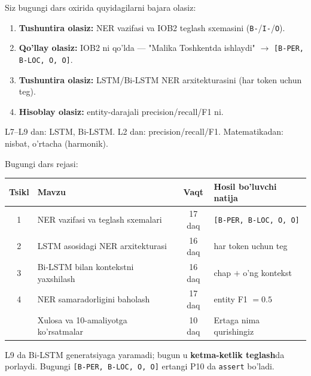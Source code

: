 \documentclass[aspectratio=169,11pt]{beamer}
\begin{document}
\begin{frame}{Siz bugungi dars oxirida quyidagilarni bajara olasiz:}
  \begin{enumerate}\setlength\itemsep{6pt}
    \item \textbf{Tushuntira olasiz:} NER vazifasi va IOB2 teglash sxemasini
          (\texttt{B-}/\texttt{I-}/\texttt{O}).
    \item \textbf{Qo'llay olasiz:} IOB2 ni qo'lda --- "Malika Toshkentda ishlaydi"
          $\to$ \texttt{[B-PER, B-LOC, O, O]}.
    \item \textbf{Tushuntira olasiz:} LSTM/Bi-LSTM NER arxitekturasini (har token
          uchun teg).
    \item \textbf{Hisoblay olasiz:} entity-darajali precision/recall/F1 ni.
  \end{enumerate}
  \vspace{4pt}
  \begin{tcolorbox}[defbox,title=Oldindan talab]
    \footnotesize
    L7--L9 dan: LSTM, Bi-LSTM. L2 dan: precision/recall/F1. Matematikadan: nisbat,
    o'rtacha (harmonik).
  \end{tcolorbox}
\end{frame}

\begin{frame}{Bugungi dars rejasi:}
  \begin{center}
  \small
  \begin{tabular}{c p{5.0cm} c p{3.0cm}}
    \toprule
    \textbf{Tsikl}& \textbf{Mavzu} & \textbf{Vaqt} & \textbf{Hosil bo'luvchi natija}\\
    \midrule
    1 & NER vazifasi va teglash sxemalari & 17 daq & \texttt{[B-PER, B-LOC, O, O]} \\
    2 & LSTM asosidagi NER arxitekturasi & 16 daq & har token uchun teg \\
    3 & Bi-LSTM bilan kontekstni yaxshilash & 16 daq & chap $+$ o'ng kontekst \\
    4 & NER samaradorligini baholash & 17 daq & entity F1 $=0.5$ \\
    \midrule
      & Xulosa va 10-amaliyotga ko'rsatmalar & 10 daq & Ertaga nima qurishingiz \\
    \bottomrule
  \end{tabular}
  \end{center}
  \vspace{4pt}
  \begin{tcolorbox}[warnbox,title=Bu dars Bi-LSTM ning asl uyiga olib keladi]
    \footnotesize\sloppy
    L9 da Bi-LSTM generatsiyaga yaramadi; bugun u \textbf{ketma-ketlik teglash}da
    porlaydi. Bugungi \texttt{[B-PER, B-LOC, O, O]} ertangi P10 da \texttt{assert} bo'ladi.
  \end{tcolorbox}
\end{frame}
\end{document}
